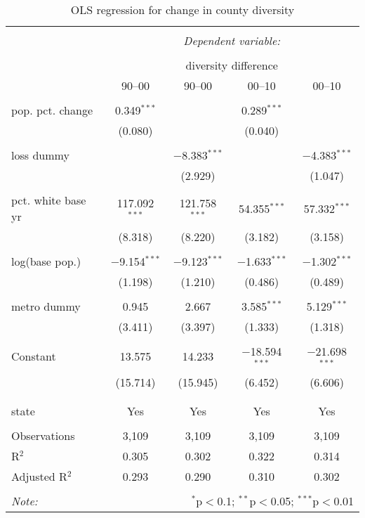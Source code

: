
\begin{table}[p] \centering 
  \caption{OLS regression for change in county diversity} 
  \label{} 
\begin{tabular}{@{\extracolsep{5pt}}lcccc} 
\\[-1.8ex]\hline 
\hline \\[-1.8ex] 
 & \multicolumn{4}{c}{\textit{Dependent variable:}} \\ 
\cline{2-5} 
\\[-1.8ex] & \multicolumn{4}{c}{diversity difference} \\ 
 & 90--00 & 90--00 & 00--10 & 00--10 \\ 
\hline \\[-1.8ex] 
 pop. pct. change & 0.349$^{***}$ &  & 0.289$^{***}$ &  \\ 
  & (0.080) &  & (0.040) &  \\ 
  & & & & \\ 
 loss dummy &  & $-$8.383$^{***}$ &  & $-$4.383$^{***}$ \\ 
  &  & (2.929) &  & (1.047) \\ 
  & & & & \\ 
 pct. white base yr & 117.092$^{***}$ & 121.758$^{***}$ & 54.355$^{***}$ & 57.332$^{***}$ \\ 
  & (8.318) & (8.220) & (3.182) & (3.158) \\ 
  & & & & \\ 
 log(base pop.) & $-$9.154$^{***}$ & $-$9.123$^{***}$ & $-$1.633$^{***}$ & $-$1.302$^{***}$ \\ 
  & (1.198) & (1.210) & (0.486) & (0.489) \\ 
  & & & & \\ 
 metro dummy & 0.945 & 2.667 & 3.585$^{***}$ & 5.129$^{***}$ \\ 
  & (3.411) & (3.397) & (1.333) & (1.318) \\ 
  & & & & \\ 
 Constant & 13.575 & 14.233 & $-$18.594$^{***}$ & $-$21.698$^{***}$ \\ 
  & (15.714) & (15.945) & (6.452) & (6.606) \\ 
  & & & & \\ 
\hline \\[-1.8ex] 
state & Yes & Yes & Yes & Yes \\ 
\hline \\[-1.8ex] 
Observations & 3,109 & 3,109 & 3,109 & 3,109 \\ 
R$^{2}$ & 0.305 & 0.302 & 0.322 & 0.314 \\ 
Adjusted R$^{2}$ & 0.293 & 0.290 & 0.310 & 0.302 \\ 
\hline 
\hline \\[-1.8ex] 
\textit{Note:}  & \multicolumn{4}{r}{$^{*}$p$<$0.1; $^{**}$p$<$0.05; $^{***}$p$<$0.01} \\ 
\end{tabular} 
\end{table} 
